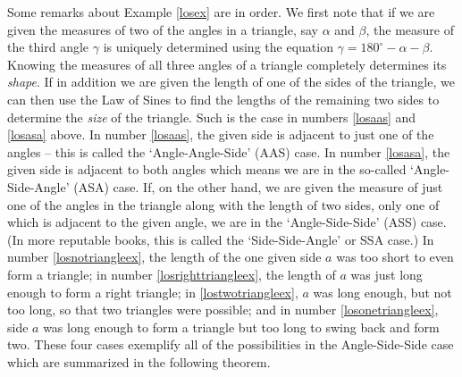 Some remarks about Example \ref{losex} are in order. We first note that if we are given the measures of two of the angles in a triangle, say $\alpha$ and $\beta$, the measure of the third angle $\gamma$ is uniquely determined using the equation  $\gamma = 180^{\circ} - \alpha - \beta$.  Knowing the measures of all three angles of a triangle completely determines its \textit{shape}. If in addition we are given the length of one of the sides of the triangle, we can then use the Law of Sines to find the lengths of the remaining two sides to determine the \textit{size} of the triangle. Such is the case in numbers \ref{losaas} and \ref{losasa} above.  In number \ref{losaas}, the given side is adjacent to just one of the angles -- this is called the `Angle-Angle-Side' (AAS) case.
In number \ref{losasa}, the given side is adjacent to both angles which means we are in the so-called `Angle-Side-Angle' (ASA) case. If, on the other hand, we are given the measure of just one of the angles in the triangle along with the length of two sides, only one of which is adjacent to the given angle, we are in the `Angle-Side-Side' (ASS) case.(In more reputable books, this is called the `Side-Side-Angle' or SSA case.)  In number \ref{losnotriangleex}, the length of the one given side $a$ was too short to even form a triangle;  in number \ref{losrighttriangleex}, the length of $a$ was just long enough to form a right triangle;  in \ref{lostwotriangleex}, $a$ was long enough, but not too long, so that two triangles were possible; and in number \ref{losonetriangleex}, side $a$ was long enough to form a triangle but too long to swing back and form two. These four cases exemplify all of the possibilities in the Angle-Side-Side case which are summarized in the following theorem.

\smallskip

